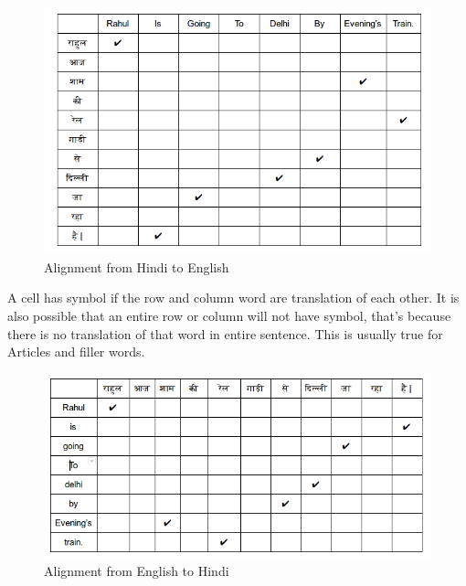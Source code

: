\begin{figure}[H]
        \centering
        \includegraphics[scale=0.4]{Images/hindi_english}
        \caption{Alignment from Hindi to English}
        \label{fig:hindi_english}
\end{figure}
 A cell has \checkmark symbol if the row and column word are translation of each other. It is also possible that an entire row or column will not have \checkmark symbol, that's because there is no translation of that word in entire sentence. This is usually true for Articles and filler words.
\begin{figure}[H]
        \centering
        \includegraphics[scale=0.4]{Images/english_hindi}
        \caption{Alignment from English to Hindi}
        \label{fig:english_hindi}
\end{figure}
